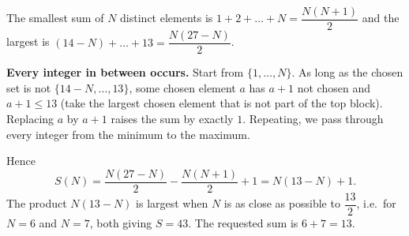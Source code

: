 The smallest sum of $N$ distinct elements is $1+2+\dots+N=\dfrac{N(N+1)}{2}$ and the largest is $(14-N)+\dots+13=\dfrac{N(27-N)}{2}$.

\textbf{Every integer in between occurs.} Start from $\{1,\dots,N\}$. As long as the chosen set is not $\{14-N,\dots,13\}$, some chosen element $a$ has $a+1$ not chosen and $a+1\le13$ (take the largest chosen element that is not part of the top block). Replacing $a$ by $a+1$ raises the sum by exactly $1$. Repeating, we pass through every integer from the minimum to the maximum.

Hence
\[
S(N)=\dfrac{N(27-N)}{2}-\dfrac{N(N+1)}{2}+1=N(13-N)+1 .
\]
The product $N(13-N)$ is largest when $N$ is as close as possible to $\dfrac{13}{2}$, i.e.\ for $N=6$ and $N=7$, both giving $S=43$. The requested sum is $6+7=\boxed{13}$.
